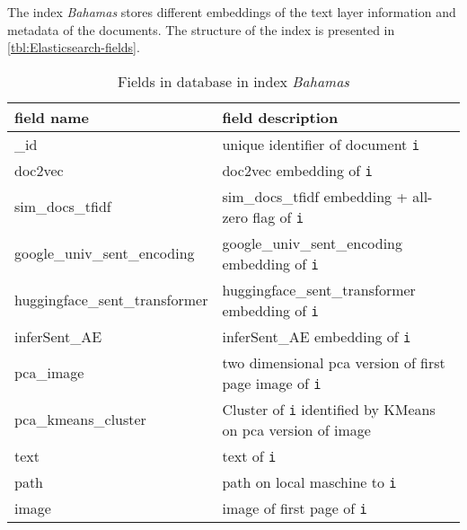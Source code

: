 The index \textit{Bahamas} stores different embeddings of the text layer information and metadata of the documents.
The structure of the index is presented in \autoref{tbl:Elasticsearch-fields}.

\begin{table}[]
    \caption{Fields in \databaseName{} database in index \textit{Bahamas}}
    \begin{tabular}{|
    >{\columncolor[HTML]{EFEFEF}}l |p{}|}
    \hline
    \cellcolor[HTML]{C0C0C0}\textbf{field name} & \cellcolor[HTML]{C0C0C0}\textbf{field description}                                       \\ \hline
    \_id                                        & unique identifier of document \texttt{i}                                                 \\ \hline
    doc2vec                                     & doc2vec embedding of \texttt{i}                                                          \\ \hline
    sim\_docs\_tfidf                            & sim\_docs\_tfidf embedding + all-zero flag of \texttt{i}                                 \\ \hline
    google\_univ\_sent\_encoding                & google\_univ\_sent\_encoding embedding of \texttt{i}                                     \\ \hline
    huggingface\_sent\_transformer              & huggingface\_sent\_transformer embedding of \texttt{i}                                   \\ \hline
    inferSent\_AE                               & inferSent\_AE embedding of \texttt{i}                                                    \\ \hline
    pca\_image                                  & two dimensional \ac{pca} version of first page image of \texttt{i}                      \\ \hline
    pca\_kmeans\_cluster                        & Cluster of \texttt{i} identified by KMeans on \ac{pca} version of image                 \\ \hline
    text                                        & text of \texttt{i}                                                                       \\ \hline
    path                                        & path on local maschine to \texttt{i}                                                     \\ \hline
    image                                       & image of first page of \texttt{i}                                                        \\ \hline
    \end{tabular}
    \label{tbl:Elasticsearch-fields}
\end{table}


